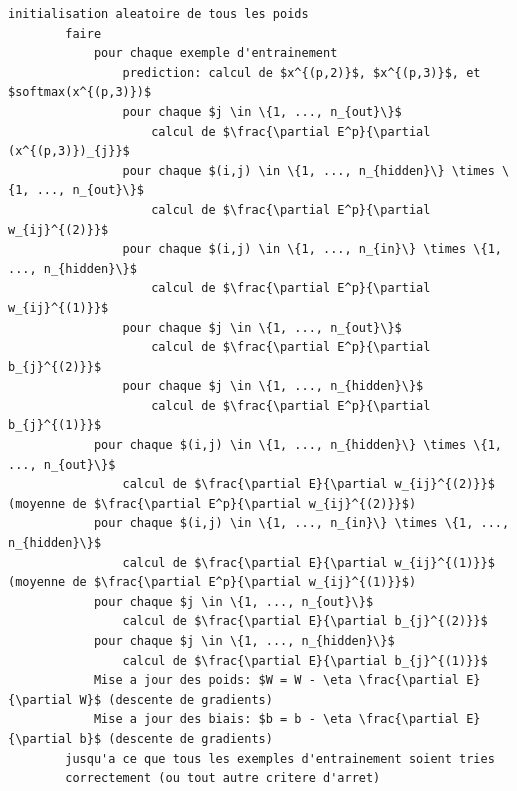 \documentclass[a4paper,11pt,oneside,roman]{article}
\begin{document}
    \begin{lstlisting}[mathescape]
        initialisation aleatoire de tous les poids
        faire
            pour chaque exemple d'entrainement
                prediction: calcul de $x^{(p,2)}$, $x^{(p,3)}$, et $softmax(x^{(p,3)})$
                pour chaque $j \in \{1, ..., n_{out}\}$
                    calcul de $\frac{\partial E^p}{\partial (x^{(p,3)})_{j}}$
                pour chaque $(i,j) \in \{1, ..., n_{hidden}\} \times \{1, ..., n_{out}\}$
                    calcul de $\frac{\partial E^p}{\partial w_{ij}^{(2)}}$
                pour chaque $(i,j) \in \{1, ..., n_{in}\} \times \{1, ..., n_{hidden}\}$
                    calcul de $\frac{\partial E^p}{\partial w_{ij}^{(1)}}$
                pour chaque $j \in \{1, ..., n_{out}\}$
                    calcul de $\frac{\partial E^p}{\partial b_{j}^{(2)}}$
                pour chaque $j \in \{1, ..., n_{hidden}\}$
                    calcul de $\frac{\partial E^p}{\partial b_{j}^{(1)}}$
            pour chaque $(i,j) \in \{1, ..., n_{hidden}\} \times \{1, ..., n_{out}\}$
                calcul de $\frac{\partial E}{\partial w_{ij}^{(2)}}$ (moyenne de $\frac{\partial E^p}{\partial w_{ij}^{(2)}}$)
            pour chaque $(i,j) \in \{1, ..., n_{in}\} \times \{1, ..., n_{hidden}\}$
                calcul de $\frac{\partial E}{\partial w_{ij}^{(1)}}$ (moyenne de $\frac{\partial E^p}{\partial w_{ij}^{(1)}}$)
            pour chaque $j \in \{1, ..., n_{out}\}$
                calcul de $\frac{\partial E}{\partial b_{j}^{(2)}}$
            pour chaque $j \in \{1, ..., n_{hidden}\}$
                calcul de $\frac{\partial E}{\partial b_{j}^{(1)}}$
            Mise a jour des poids: $W = W - \eta \frac{\partial E}{\partial W}$ (descente de gradients)
            Mise a jour des biais: $b = b - \eta \frac{\partial E}{\partial b}$ (descente de gradients)
        jusqu'a ce que tous les exemples d'entrainement soient tries 
        correctement (ou tout autre critere d'arret)
    \end{lstlisting}

    
\end{document}
